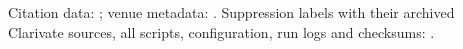 Citation data: \citet{arjomandi2024dataset}; venue metadata: \citet{ocmeta2024dump}. Suppression labels with their
archived Clarivate sources, all scripts, configuration, run logs and checksums: .
